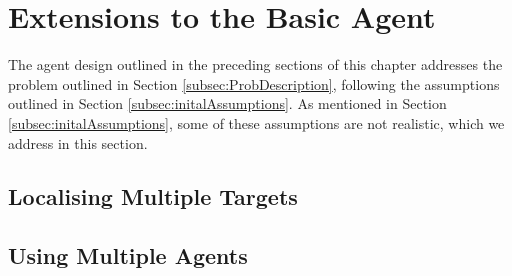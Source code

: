 \section{Extensions to the Basic Agent}
The agent design outlined in the preceding sections of this chapter addresses the problem outlined in Section \ref{subsec:ProbDescription},  following the assumptions outlined in Section \ref{subsec:initalAssumptions}. As mentioned in Section \ref{subsec:initalAssumptions}, some of these assumptions are not realistic, which we address in this section. \par

\subsection{Localising Multiple Targets}\label{subsubsec:LocalisingMultipleTargets}


\subsection{Using Multiple Agents}\label{subsubsec:UsingMultipleAgents}
